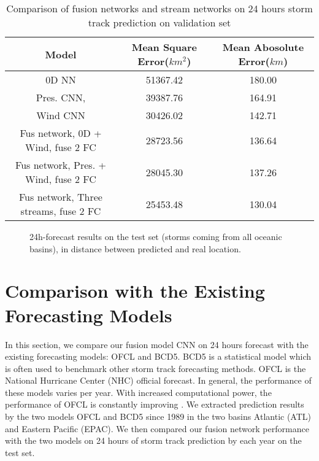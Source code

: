 \begin{table}[]
	\centering
	\caption{Comparison of fusion networks and stream networks on 24 hours storm track prediction on validation set}
	\label{table:fus_compare_}
	\begin{tabular}{|c|c|c|}
		\hline
		Model & Mean Square Error($km^2$) & Mean Abosolute Error($km$) \\ \hline
		0D NN & 51367.42 & 180.00 \\ \hline
		Pres. CNN, & 39387.76 & 164.91 \\ \hline
		Wind CNN & 30426.02 & 142.71 \\ \hline
		Fus network, 0D + Wind, fuse 2 FC  & 28723.56 & 136.64 \\ \hline
		Fus network, Pres. + Wind, fuse 2 FC & 28045.30 & 137.26 \\ \hline
		Fus network, Three streams, fuse 2 FC & 25453.48 & 130.04 \\ \hline
		
		
	\end{tabular}
\end{table}

\begin{figure}
	\begin{center}
		\hsize {}
	\end{center}
	\caption{24h-forecast results on the test set (storms coming from all oceanic basins), in distance between predicted and real location.}
	\label{fig:boxplots}
\end{figure}

\section{Comparison with the Existing Forecasting Models}
In this section, we compare our fusion model CNN on 24 hours forecast with the existing forecasting models: OFCL and BCD5. BCD5 is a statistical model which is often used to benchmark other storm track forecasting methods. OFCL is the National Hurricane Center (NHC) official forecast. In general, the performance of these models varies per year. With increased computational power, the performance of OFCL is constantly improving \cite{hurricane_models}. We extracted prediction results by the two models OFCL and BCD5 since 1989 in the two basins Atlantic (ATL) and Eastern Pacific (EPAC). We then compared our fusion network performance with the two models on 24 hours of storm track prediction by each year on the test set.
